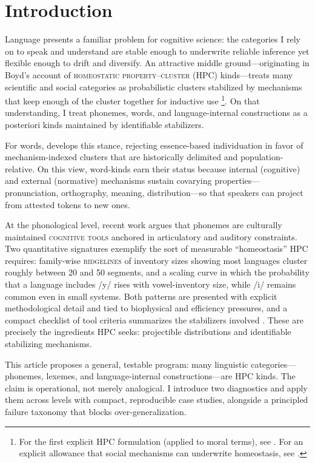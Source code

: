 \documentclass[12pt]{article}
\begin{document}
\section{Introduction}
Language presents a familiar problem for cognitive science: the categories I rely on to speak and understand are stable enough to underwrite reliable inference yet flexible enough to drift and diversify. An attractive middle ground---originating in Boyd’s account of \textsc{homeostatic property–cluster} (HPC) kinds---treats many scientific and social categories as probabilistic clusters stabilized by mechanisms that keep enough of the cluster together for inductive use \citep{Boyd1991Enthusiasm,Boyd1999Homeostasis}\footnote{For the first explicit HPC formulation (applied to moral terms), see \citet[§3.8]{Boyd1988MoralRealist}. For an explicit allowance that social mechanisms can underwrite homeostasis, see \citet{Boyd2000Workmanship}.}. On that understanding, I treat phonemes, words, and language-internal constructions as a posteriori kinds maintained by identifiable stabilizers.

For words, \citet{Miller2021WordsSpeciesKinds} develops this stance, rejecting essence-based individuation in favor of mechanism-indexed clusters that are historically delimited and population-relative. On this view, word-kinds earn their status because internal (cognitive) and external (normative) mechanisms sustain covarying properties---pronunciation, orthography, meaning, distribution---so that speakers can project from attested tokens to new ones.


At the phonological level, recent work argues that phonemes are culturally maintained \textsc{cognitive tools} anchored in articulatory and auditory constraints. Two quantitative signatures exemplify the sort of measurable ``homeostasis'' HPC requires: family-wise \textsc{ridgelines} of inventory sizes showing most languages cluster roughly between 20 and 50 segments, and a scaling curve in which the probability that a language includes /y/ rises with vowel-inventory size, while /i/ remains common even in small systems. Both patterns are presented with explicit methodological detail and tied to biophysical and efficiency pressures, and a compact checklist of tool criteria summarizes the stabilizers involved \citep[Fig.\,1 p.\,4; Fig.\,2 p.\,7; Table\,1 p.\,14]{Ekstrom2025PhonemeTool}. These are precisely the ingredients HPC seeks: projectible distributions and identifiable stabilizing mechanisms.

This article proposes a general, testable program: many linguistic categories---phonemes, lexemes, and language-internal constructions---are HPC kinds. The claim is operational, not merely analogical. I introduce two diagnostics and apply them across levels with compact, reproducible case studies, alongside a principled failure taxonomy that blocks over-generalization.
\end{document}
